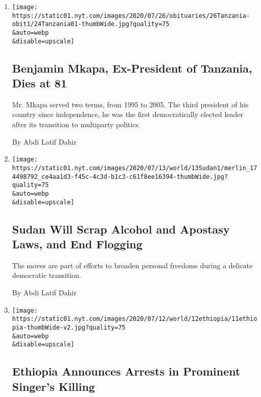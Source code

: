 \begin{enumerate}
\def\labelenumi{\arabic{enumi}.}
\item
  \href{/2020/07/24/world/africa/benjamin-mkapa-dead.html}{}

  \texttt{[image: https://static01.nyt.com/images/2020/07/26/obituaries/26Tanzania-obit1/24Tanzania01-thumbWide.jpg?quality=75\\\&auto=webp\\\&disable=upscale]}

  \hypertarget{benjamin-mkapa-ex-president-of-tanzania-dies-at-81}{%
  \subsection{Benjamin Mkapa, Ex-President of Tanzania, Dies at
  81}\label{benjamin-mkapa-ex-president-of-tanzania-dies-at-81}}

  Mr. Mkapa served two terms, from 1995 to 2005. The third president of
  his country since independence, he was the first democratically
  elected leader after its transition to multiparty politics.

  By Abdi Latif Dahir
\item
  \href{/2020/07/13/world/africa/sudan-fgm-alcohol-flogging.html}{}

  \texttt{[image: https://static01.nyt.com/images/2020/07/13/world/13Sudan1/merlin\_174498792\_ce4aa1d3-f45c-4c3d-b1c3-c61f8ee16394-thumbWide.jpg?quality=75\\\&auto=webp\\\&disable=upscale]}

  \hypertarget{sudan-will-scrap-alcohol-and-apostasy-laws-and-end-flogging}{%
  \subsection{Sudan Will Scrap Alcohol and Apostasy Laws, and End
  Flogging}\label{sudan-will-scrap-alcohol-and-apostasy-laws-and-end-flogging}}

  The moves are part of efforts to broaden personal freedoms during a
  delicate democratic transition.

  By Abdi Latif Dahir
\item
  \href{/2020/07/11/world/africa/ethiopia-hachalu-hundessa.html}{}

  \texttt{[image: https://static01.nyt.com/images/2020/07/12/world/12ethiopia/11ethiopia-thumbWide-v2.jpg?quality=75\\\&auto=webp\\\&disable=upscale]}

  \hypertarget{ethiopia-announces-arrests-in-prominent-singers-killing}{%
  \subsection{Ethiopia Announces Arrests in Prominent Singer's
  Killing}\label{ethiopia-announces-arrests-in-prominent-singers-killing}}


\end{enumerate}
